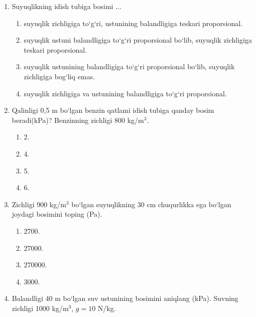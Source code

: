 \begin{enumerate}
1) idish shakliga; 2) idish tubining yuziga; 3) idishdagi suyuqlik zichligiga; 4) suyuqlik ustunining balandligiga.
\begin{enumerate}[label=\Alph*)]
\item 1 va 2.
\item 2 va 3.
\item 3 va 4.
\item 1 va 4.  
\end{enumerate}

\item Suyuqlikning idish tubiga bosimi ...
\begin{enumerate}[label=\Alph*)]
\item  suyuqlik zichligiga to‘g‘ri, ustunining balandligiga teskari proporsional. 
\item  suyuqlik ustuni balandligiga to‘g‘ri proporsional bo‘lib, suyuqlik zichligiga teskari proporsional. 
\item  suyuqlik ustunining balandligiga to‘g‘ri proporsional bo‘lib, suyuqlik zichligiga bog‘liq emas. 
\item  suyuqlik zichligiga va ustunining balandligiga to‘g‘ri proporsional.
\end{enumerate}

\item Qalinligi 0,5 m bo‘lgan benzin qatlami idish tubiga qanday bosim beradi(kPa)? 
Benzinning zichligi 800 kg/m$^3$.

\begin{enumerate}[label=\Alph*)]
\item 2.
\item 4.
\item 5.
\item 6.
\end{enumerate}


\item Zichligi 900 kg/m$^3$ bo‘lgan suyuqlikning 30 cm chuqurlikka ega bo‘lgan joydagi bosimini toping (Pa).

\begin{enumerate}[label=\Alph*)]
\item 2700.
\item 27000.
\item 270000.
\item 3000.
\end{enumerate}


\item Balandligi 40 m bo‘lgan suv ustunining bosimini aniqlang (kPa). Suvning zichligi 1000 kg/m$^3$, $g=10$ N/kg.


\end{enumerate}
